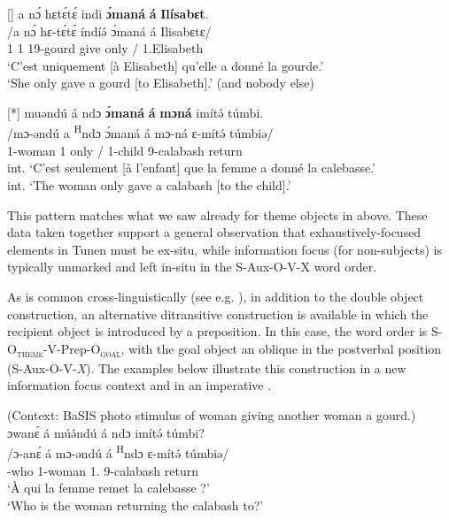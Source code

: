 \documentclass[output=paper,colorlinks,citecolor=brown
]{langscibook}
\begin{document}
\ex
[]{
\label{onlyset.e}
\glll
{\db}a nɔ́ hɛtɛ́tɛ́ indi \textbf{ɔ́maná} \textbf{á} \textbf{Ilísabɛt}. \\
/a nɔ́ hɛ-tɛ́tɛ́ índíə́ ɔ́maná á Ilisabɛtɛ/ \\
{\db}1\SM{} \PST{}1{} 19-gourd give only \COP/\PREP{} 1.Elisabeth \\
\glt
`C'est uniquement [à Elisabeth]\textsubscript{\FOC{}} qu'elle a donné la gourde.' \\ `She only gave a gourd [to Elisabeth]\textsubscript{\FOC{}}.' (and nobody else) \jambox*{[PM 1559] }
}


\ex
[*]{
\label{onlyset.c}
\glll
{\db}muəndú á ndɔ \textbf{ɔ́maná} \textbf{á} \textbf{mɔná} imítə́ túmbi. \\
/mɔ-əndú a \textsuperscript{H}ndɔ ɔ́maná á mɔ-ná ɛ-mítə́ túmbiə/ \\
{\db}1-woman 1\SM{} \PRS{} only \COP/\PREP{} 1-child 9-calabash return \\
\glt
int. ‘C'est seulement [à l'enfant]\textsubscript{\FOC{}} que la femme a donné la calebasse.' \\ int. `The woman only gave a calabash [to the child]\textsubscript{\FOC{}}.' \jambox*{[JO 1591] }
}

\z
\z

This pattern matches what we saw already for theme objects in  above. These data taken together support a general observation that exhaustively\hyp focused elements in Tunen must be ex-situ, while information focus (for non-subjects) is typically unmarked and left in-situ in the S-Aux-O-V-X word order.

As is common cross-linguistically (see e.g. \citealt{MalchukovEtAl2010}), in addition to the double object construction, an alternative ditransitive construction is available in which the recipient object is introduced by a preposition. In this case, the word order is S-O\textsubscript{\textsc{theme}}-V-Prep-O\textsubscript{\textsc{goal}}, with the goal object an oblique in the postverbal position (S-Aux-O-V-\textit{X}). The examples below illustrate this construction in a new information focus context  and in an imperative .

\ea \label{ditransalt1}
\ea
\begin{xlist}
\label{ditransalt1q}
(Context: BaSIS photo stimulus of woman giving another woman a gourd.) \\ 
\glll
{\db}ɔwanɛ́ á múə́ndú á ndɔ imítə́ túmbi? \\
/ɔ-anɛ́ á mɔ-əndú á \textsuperscript{H}ndɔ ɛ-mítə́ túmbiə/ \\
{\db}\PREP{}-who \COP{} 1-woman 1\SM{}.\REL{} \PRS{} 9-calabash return \\
\glt
`À qui la femme remet la calebasse ?' \\ `Who is the woman returning the calabash to?' \jambox*{[JO 1583] } 
\end{xlist}
\end{document}
